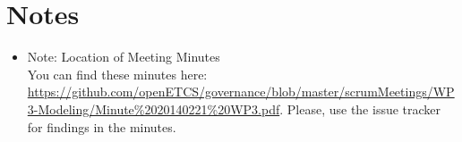 \documentclass[a4paper, 11pt]{article}
\begin{document}
\section{Notes}
\begin{itemize}

\item Note: Location of Meeting Minutes\\
You can find these minutes here: \url{https://github.com/openETCS/governance/blob/master/scrumMeetings/WP3-Modeling/Minute%2020140221%20WP3.pdf}. Please, use the issue tracker for findings in the minutes.
\end{itemize}
\end{document}
